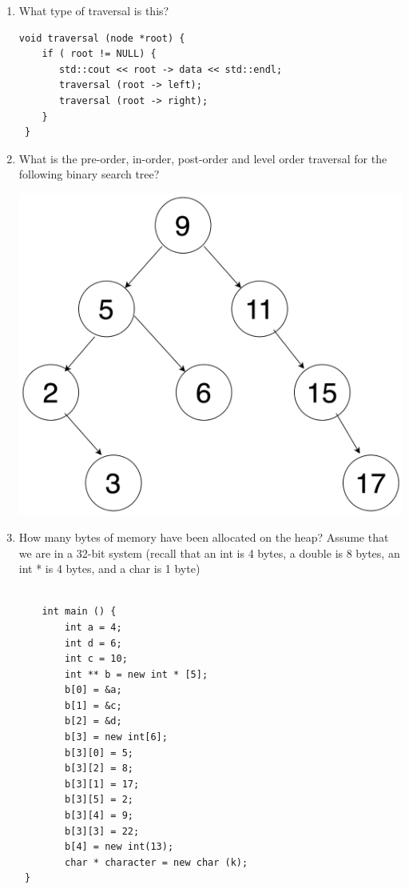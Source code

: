 \documentclass{article}
\begin{document}
\begin{enumerate}[label=(\alph*), itemsep = 120pt]
    \item \textbf{} What type of traversal is this?
    \begin{lstlisting}[style=CStyle]
void traversal (node *root) {
    if ( root != NULL) {
       std::cout << root -> data << std::endl;
       traversal (root -> left);
       traversal (root -> right);
    }
 }
    \end{lstlisting}

\item \textbf{}
What is the pre-order, in-order, post-order and level order traversal for the following binary search tree?

\includegraphics[scale = 0.125]{figures/bst2.png}


\item \textbf{}
How many bytes of memory have been allocated on the heap? Assume that we are in a 32-bit system (recall that an int is 4 bytes, a double is 8 bytes, an int * is 4 bytes, and a char is 1 byte)

    \begin{lstlisting}[style=CStyle]

    int main () {
        int a = 4;
        int d = 6;
        int c = 10; 
        int ** b = new int * [5];  
        b[0] = &a;
        b[1] = &c;   
        b[2] = &d;
        b[3] = new int[6];
        b[3][0] = 5;
        b[3][2] = 8;
        b[3][1] = 17;
        b[3][5] = 2;
        b[3][4] = 9;
        b[3][3] = 22; 
        b[4] = new int(13);
        char * character = new char (k);
 }



\end{lstlisting}
\end{enumerate}
\end{document}
